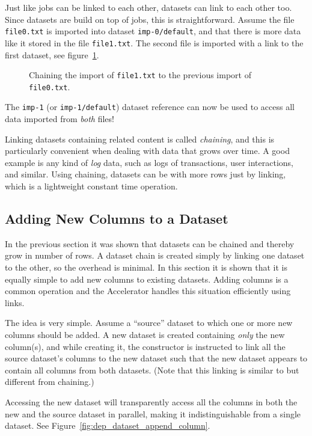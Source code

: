 Just like jobs can be linked to each other, datasets can link to each
other too.  Since datasets are build on top of jobs, this is
straightforward.  Assume the file \texttt{file0.txt} is imported into
dataset \texttt{imp-0/default}, and that there is more data like it
stored in the file \texttt{file1.txt}.  The second file is imported
with a link to the first dataset, see
figure~\ref{fig:dataset_csvimport_chain}.
\begin{figure}[h!]
  \begin{center}
    
    \caption{Chaining the import of \texttt{file1.txt} to the previous
      import of \texttt{file0.txt}.}
    \label{fig:dataset_csvimport_chain}
  \end{center}
\end{figure}
The \texttt{imp-1} (or \texttt{imp-1/default}) dataset reference can
now be used to access all data imported from \textsl{both} files!

Linking datasets containing related content is called \emph{chaining},
and this is particularly convenient when dealing with data that grows
over time.  A good example is any kind of \emph{log} data, such as
logs of transactions, user interactions, and similar.  Using chaining,
datasets can be with more rows just by linking, which is a lightweight
constant time operation.



\subsection{Adding New Columns to a Dataset}
In the previous section it was shown that datasets can be chained and
thereby grow in number of rows.  A dataset chain is created simply by
linking one dataset to the other, so the overhead is minimal.  In this
section it is shown that it is equally simple to add new columns to
existing datasets.  Adding columns is a common operation and the
Accelerator handles this situation efficiently using links.

The idea is very simple.  Assume a ``source'' dataset to which one or
more new columns should be added.  A new dataset is created containing
\textsl{only} the new column(s), and while creating it, the
constructor is instructed to link all the source dataset's columns to
the new dataset such that the new dataset appears to contain all
columns from both datasets.  (Note that this linking is similar to but
different from chaining.)

Accessing the new dataset will transparently access all the columns in
both the new and the source dataset in parallel, making it
indistinguishable from a single dataset.  See
Figure~\ref{fig:dep_dataset_append_column}.

